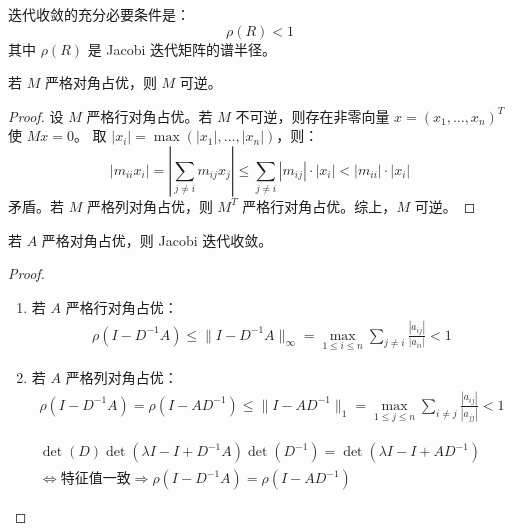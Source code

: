 迭代收敛的充分必要条件是：
\[
\rho(R) < 1
\]
其中 $\rho(R)$ 是 Jacobi 迭代矩阵的谱半径。
\begin{theorem}
    若 $M$ 严格对角占优，则 $M$ 可逆。
\begin{proof}
     设 $M$ 严格行对角占优。若 $M$ 不可逆，则存在非零向量 $x = (x_1, \dots, x_n)^T$ 使 $Mx = 0$。
    取 $|x_i| = \max(|x_1|, \dots, |x_n|)$，则：
    \[
    |m_{ii}x_i| = \left|\sum_{j\neq i} m_{ij}x_j\right| \leq \sum_{j\neq i} |m_{ij}|\cdot|x_i| < |m_{ii}|\cdot|x_i|
    \]
    矛盾。若 $M$ 严格列对角占优，则 $M^T$ 严格行对角占优。综上，$M$ 可逆。
\end{proof}
\end{theorem}
\begin{theorem}
    若 $A$ 严格对角占优，则 Jacobi 迭代收敛。
\begin{proof}
\begin{enumerate}
    \item[] 若 $A$ 严格行对角占优：
    \begin{gather*}
    \rho(I - D^{-1}A) \leq \|I - D^{-1}A\|_\infty 
    = \max_{1 \leq i \leq n} \sum_{j \neq i} \frac{|a_{ij}|}{|a_{ii}|} < 1
    \end{gather*}
    \item[] 若 $A$ 严格列对角占优：
    \begin{gather*}
    \rho(I - D^{-1}A) = \rho(I - AD^{-1}) \leq \|I - AD^{-1}\|_1 
    = \max_{1 \leq j \leq n} \sum_{i \neq j} \frac{|a_{ij}|}{|a_{jj}|} < 1
    \end{gather*}
\end{enumerate}
\begin{note}
    \begin{gather*}
        \det(D)\det(\lambda I - I + D^{-1}A)\det(D^{-1}) = \det(\lambda I - I + AD^{-1})\\
        \Leftrightarrow \text{特征值一致} \Rightarrow \rho(I - D^{-1}A) = \rho(I - AD^{-1})
    \end{gather*}
\end{note}
\end{proof}
\end{theorem}

